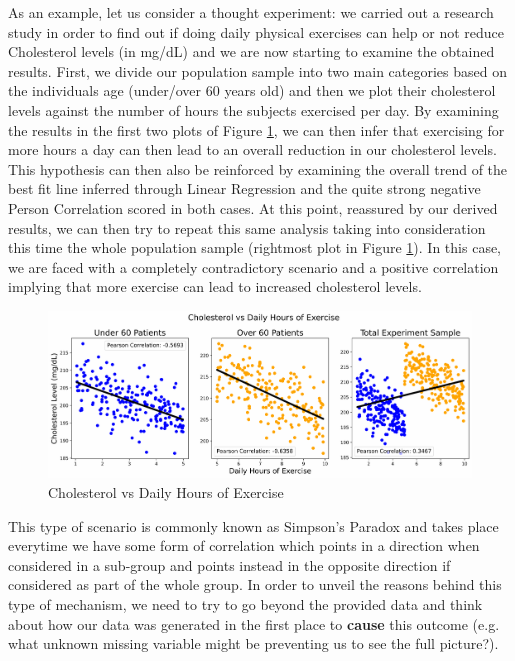 As an example, let us consider a thought experiment: we carried out a research study in order to find out if doing daily physical exercises can help or not reduce Cholesterol levels (in mg/dL) and we are now starting to examine the obtained results. First, we divide our population sample into two main categories based on the individuals age (under/over 60 years old) and then we plot their cholesterol levels against the number of hours the subjects exercised per day. By examining the results in the first two plots of Figure \ref{s1}, we can then infer that exercising for more hours a day can then lead to an overall reduction in our cholesterol levels. This hypothesis can then also be reinforced by examining the overall trend of the best fit line inferred through Linear Regression and the quite strong negative Person Correlation scored in both cases. At this point, reassured by our derived results, we can then try to repeat this same analysis taking into consideration this time the whole population sample (rightmost plot in Figure \ref{s1}). In this case, we are faced with a completely contradictory scenario and a positive correlation implying that more exercise can lead to increased cholesterol levels.

\begin{figure}[ht!]%
    \centering
    \includegraphics[width=1\linewidth]{latex/images/simpson1.pdf}
    \vspace{-0.5cm}
    \caption{Cholesterol vs Daily Hours of Exercise}
    \label{s1}
\end{figure}
\vspace{-0.7cm}

This type of scenario is commonly known as Simpson's Paradox and takes place everytime we have some form of correlation which points in a direction when considered in a sub-group and points instead in the opposite direction if considered as part of the whole group. In order to unveil the reasons behind this type of mechanism, we need to try to go beyond the provided data and think about how our data was generated in the first place to \textbf{cause} this outcome (e.g. what unknown missing variable might be preventing us to see the full picture?).

